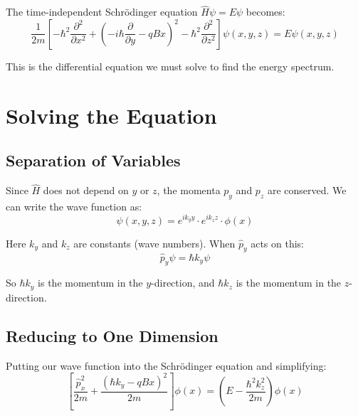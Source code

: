 \documentclass[11pt,a4paper]{article}
\let\oldsection\section
\renewcommand{\section}{\needspace{5\baselineskip}\oldsection}
\let\oldsubsection\subsection
\renewcommand{\subsection}{\needspace{4\baselineskip}\oldsubsection}
\theoremstyle{definition}
\theoremstyle{remark}
\begin{document}
The time-independent Schrödinger equation $\hat{H}\psi = E\psi$ becomes:
\begin{equation}
    \frac{1}{2m}\left[ -\hbar^2\frac{\partial^2}{\partial x^2} + \left(-i\hbar\frac{\partial}{\partial y} - qBx\right)^2 - \hbar^2\frac{\partial^2}{\partial z^2} \right] \psi(x,y,z) = E\psi(x,y,z)
\end{equation}

This is the differential equation we must solve to find the energy spectrum.

\section{Solving the Equation}

\subsection{Separation of Variables}

Since $\hat{H}$ does not depend on $y$ or $z$, the momenta $p_y$ and $p_z$ are conserved. We can write the wave function as:
\begin{equation}
    \psi(x, y, z) = e^{ik_y y} \cdot e^{ik_z z} \cdot \phi(x)
\end{equation}

Here $k_y$ and $k_z$ are constants (wave numbers). When $\hat{p}_y$ acts on this:
\begin{equation}
    \hat{p}_y \psi = \hbar k_y \psi
\end{equation}

So $\hbar k_y$ is the momentum in the $y$-direction, and $\hbar k_z$ is the momentum in the $z$-direction.

\subsection{Reducing to One Dimension}

Putting our wave function into the Schrödinger equation and simplifying:
\begin{equation}
    \left[\frac{\hat{p}_x^2}{2m} + \frac{(\hbar k_y - qBx)^2}{2m}\right]\phi(x) = \left(E - \frac{\hbar^2 k_z^2}{2m}\right)\phi(x)
\end{equation}
\end{document}

